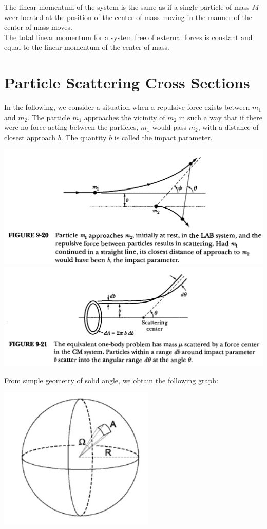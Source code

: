 \documentclass[11pt,oneside]{book}
\theoremstyle{break}
\theoremstyle{break}
\begin{document}
The linear momentum of the system is the same as if a single particle of mass $M$ weer located at the position of the center of mass moving in the manner of the center of mass moves.\\

The total linear momentum for a system free of external forces is constant and equal to the linear momentum of the center of mass. 

\newpage
\section[Particle Scattering Cross Sections]{\color{red}Particle Scattering Cross Sections\color{black}}
In the following, we consider a situation when a repulsive force exists between $m_1$ and $m_2$. The particle $m_1$ approaches the vicinity of $m_2$ in such a way that if there were no force acting between the particles, $m_1$ would pass $m_2$, with a distance of closest approach $b$. The quantity $b$ is called the impact parameter. 
\begin{center}
\includegraphics[scale=0.38]{scatter2.png}\\
\includegraphics[scale=0.38]{scatter1.png}
\end{center}
From simple geometry of solid angle, we obtain the following graph:
\begin{center}
\includegraphics[scale=0.75]{solidAngle.png}
\end{center}
\end{document}
